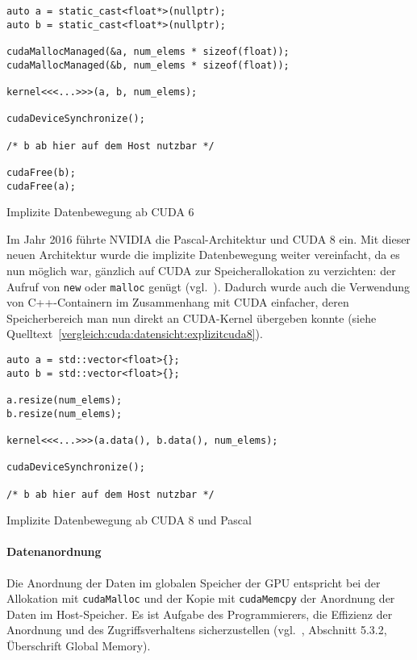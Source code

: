 \begin{code}
    \begin{verbatim}
auto a = static_cast<float*>(nullptr);
auto b = static_cast<float*>(nullptr);

cudaMallocManaged(&a, num_elems * sizeof(float));
cudaMallocManaged(&b, num_elems * sizeof(float));

kernel<<<...>>>(a, b, num_elems);

cudaDeviceSynchronize();

/* b ab hier auf dem Host nutzbar */

cudaFree(b);
cudaFree(a);
    \end{verbatim}
    \caption{Implizite Datenbewegung ab CUDA 6}
    \label{vergleich:cuda:datensicht:implizitebewegung}
\end{code}

Im Jahr 2016 führte NVIDIA die Pascal-Architektur und CUDA 8 ein. Mit dieser
neuen Architektur wurde die implizite Datenbewegung weiter vereinfacht, da es
nun möglich war, gänzlich auf CUDA zur Speicherallokation zu verzichten: der
Aufruf von \texttt{new} oder \texttt{malloc} genügt
(vgl.~\cite{harris2016}). Dadurch wurde auch die Verwendung von C++-Containern
im Zusammenhang mit CUDA einfacher, deren Speicherbereich man nun direkt an
CUDA-Kernel übergeben konnte (siehe
Quelltext~\ref{vergleich:cuda:datensicht:explizitcuda8}).

\begin{code}
    \begin{verbatim}
auto a = std::vector<float>{};
auto b = std::vector<float>{};

a.resize(num_elems);
b.resize(num_elems);

kernel<<<...>>>(a.data(), b.data(), num_elems);

cudaDeviceSynchronize();

/* b ab hier auf dem Host nutzbar */
    \end{verbatim}
    \caption{Implizite Datenbewegung ab CUDA 8 und Pascal}
    \label{vergleich:cuda:datensicht:explizitcuda8}
\end{code}

\paragraph{Datenanordnung}

Die Anordnung der Daten im globalen Speicher der GPU entspricht bei der
Allokation mit \texttt{cudaMalloc} und der Kopie mit
\texttt{cudaMemcpy} der Anordnung der Daten im Host-Speicher. Es ist
Aufgabe des Programmierers, die Effizienz der Anordnung und des
Zugriffsverhaltens sicherzustellen (vgl.~\cite{cudaguide}, Abschnitt 5.3.2,
Überschrift \glqq Global Memory\grqq).

